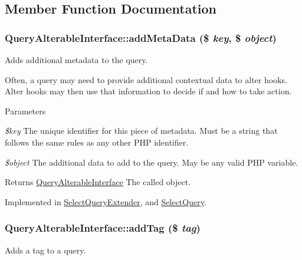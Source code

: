 \subsection{Member Function Documentation}
\hypertarget{interfaceQueryAlterableInterface_a4551fab9d5d25eeed040fdac7c8be4ae}{
\subsubsection[{addMetaData}]{\setlength{\rightskip}{0pt plus 5cm}QueryAlterableInterface::addMetaData (\$ {\em key}, \/  \$ {\em object})}}
\label{interfaceQueryAlterableInterface_a4551fab9d5d25eeed040fdac7c8be4ae}
Adds additional metadata to the query.

Often, a query may need to provide additional contextual data to alter hooks. Alter hooks may then use that information to decide if and how to take action.


\begin{DoxyParams}{Parameters}
\item[{\em \$key}]The unique identifier for this piece of metadata. Must be a string that follows the same rules as any other PHP identifier. \item[{\em \$object}]The additional data to add to the query. May be any valid PHP variable.\end{DoxyParams}
\begin{DoxyReturn}{Returns}
\hyperlink{interfaceQueryAlterableInterface}{QueryAlterableInterface} The called object. 
\end{DoxyReturn}


Implemented in \hyperlink{classSelectQueryExtender_a4ca41f7412e9f35bfd61c0c0e387c7f9}{SelectQueryExtender}, and \hyperlink{classSelectQuery_a6e453f491388dfd67e568baa8b807b01}{SelectQuery}.\hypertarget{interfaceQueryAlterableInterface_a86b5a64d7b1b34959666e9d5eada3940}{
\subsubsection[{addTag}]{\setlength{\rightskip}{0pt plus 5cm}QueryAlterableInterface::addTag (\$ {\em tag})}}
\label{interfaceQueryAlterableInterface_a86b5a64d7b1b34959666e9d5eada3940}
Adds a tag to a query.

